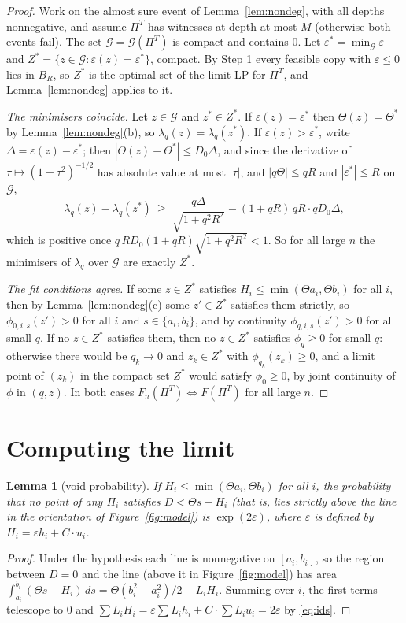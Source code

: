 \documentclass[11pt]{amsart}
\newtheorem{lemma}[theorem]{Lemma}
\theoremstyle{remark}\newtheorem{remark}[theorem]{Remark}
\begin{document}
\begin{proof}
Work on the almost sure event of Lemma~\ref{lem:nondeg}, with all depths nonnegative, and assume $\Pi^T$ has witnesses
at depth at most $M$ (otherwise both events fail). The set $\mathcal G=\mathcal G(\Pi^T)$ is compact and contains $0$.
Let $\varepsilon^*=\min_{\mathcal G}\varepsilon$ and $Z^*=\{z\in\mathcal G:\varepsilon(z)=\varepsilon^*\}$, compact.
By Step 1 every feasible copy with $\varepsilon\le0$ lies in $B_R$, so $Z^*$ is the optimal set of the limit LP for
$\Pi^T$, and Lemma~\ref{lem:nondeg} applies to it.

\emph{The minimisers coincide.} Let $z\in\mathcal G$ and $z^*\in Z^*$. If $\varepsilon(z)=\varepsilon^*$ then
$\Theta(z)=\Theta^*$ by Lemma~\ref{lem:nondeg}(b), so $\lambda_q(z)=\lambda_q(z^*)$. If $\varepsilon(z)>\varepsilon^*$,
write $\Delta=\varepsilon(z)-\varepsilon^*$; then $|\Theta(z)-\Theta^*|\le D_0\Delta$, and since the derivative of
$\tau\mapsto(1+\tau^2)^{-1/2}$ has absolute value at most $|\tau|$, and $|q\Theta|\le qR$ and $|\varepsilon^*|\le R$ on
$\mathcal G$,
\[
\lambda_q(z)-\lambda_q(z^*)\ \ge\ \frac{q\Delta}{\sqrt{1+q^2R^2}}-(1+qR)\,qR\cdot qD_0\Delta ,
\]
which is positive once $q\,RD_0(1+qR)\sqrt{1+q^2R^2}<1$. So for all large $n$ the minimisers of $\lambda_q$ over
$\mathcal G$ are exactly $Z^*$.

\emph{The fit conditions agree.} If some $z\in Z^*$ satisfies $H_i\le\min(\Theta a_i,\Theta b_i)$ for all $i$, then by
Lemma~\ref{lem:nondeg}(c) some $z'\in Z^*$ satisfies them strictly, so $\phi_{0,i,s}(z')>0$ for all $i$ and
$s\in\{a_i,b_i\}$, and by continuity $\phi_{q,i,s}(z')>0$ for all small $q$. If no $z\in Z^*$ satisfies them, then no
$z\in Z^*$ satisfies $\phi_q\ge0$ for small $q$: otherwise there would be $q_k\to0$ and $z_k\in Z^*$ with
$\phi_{q_k}(z_k)\ge0$, and a limit point of $(z_k)$ in the compact set $Z^*$ would satisfy $\phi_0\ge0$, by joint
continuity of $\phi$ in $(q,z)$. In both cases $F_n(\Pi^T)\Leftrightarrow F(\Pi^T)$ for all large $n$.
\end{proof}

\section{Computing the limit}\label{sec:formula}

\begin{lemma}[void probability]\label{lem:void}
If $H_i\le\min(\Theta a_i,\Theta b_i)$ for all $i$, the probability that no point of any $\Pi_i$ satisfies $D<\Theta s-H_i$ (that is, lies strictly above the
line in the orientation of Figure~\ref{fig:model}) is $\exp(2\varepsilon)$, where $\varepsilon$ is defined by $H_i=\varepsilon h_i+C\cdot u_i$.
\end{lemma}
\begin{proof}
Under the hypothesis each line is nonnegative on $[a_i,b_i]$, so the region between $D=0$ and the line (above it in Figure~\ref{fig:model}) has area
$\int_{a_i}^{b_i}(\Theta s-H_i)\,ds=\Theta(b_i^2-a_i^2)/2-L_iH_i$. Summing over $i$, the first terms telescope to
$0$ and $\sum L_iH_i=\varepsilon\sum L_ih_i+C\cdot\sum L_iu_i=2\varepsilon$ by \eqref{eq:ids}.
\end{proof}
\end{document}
